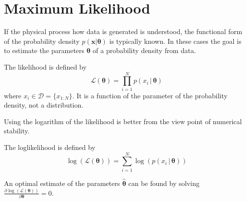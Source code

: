 \documentclass{tstextbook}
\begin{document}
\section{Maximum Likelihood}
If the physical process how data is generated is understood, the functional form of the probability density $p(\mathbf{x}\vert \boldsymbol{\theta})$ is typically known. In these cases the goal is to estimate the parameters $\boldsymbol{\theta}$ of a probability density from data.

\begin{definition}[Likelihood]
  \label{th:likelihood}
  The likelihood is defined by
  \begin{equation}
    \mathcal{L}(\boldsymbol{\theta}) = \prod_{i=1}^N p\left(x_i\,\vert\, \boldsymbol{\theta}\right)
  \end{equation}
where $x_i \in \mathcal{D}=\{x_{1:N}\}$. It is a function of the parameter of the probability density, not a distribution.
\end{definition}
Using the logarithm of the likelihood is better from the view point of numerical stability. 
\begin{definition}[Loglikelihood]
  \label{th:loglikelihood}
  The loglikelihood is defined by
  \begin{equation}
    \log(\mathcal{L}(\boldsymbol{\theta})) = \sum_{i=1}^N \log\left(p\left(x_i\,\vert\, \boldsymbol{\theta}\right)\right)
  \end{equation}
\end{definition}
An optimal estimate of the parameters $\hat{\boldsymbol{\theta}}$ can be found by solving 
$\frac{ \partial\log\left(\mathcal{L}(\boldsymbol{\theta})\right)}{\partial\boldsymbol{\theta}}=0$. 
\end{document}
